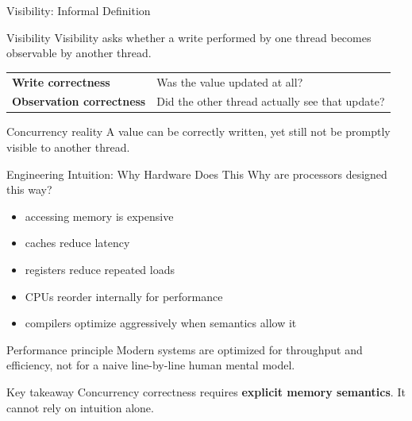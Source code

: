 \documentclass[aspectratio=169,11pt]{beamer}
\begin{document}
	\begin{frame}{Visibility: Informal Definition}
		\begin{block}{Visibility}
			Visibility asks whether a write performed by one thread becomes observable by another thread.
		\end{block}
		
		\vspace{0.3cm}
		
		\begin{center}
			\begin{tabular}{>{\bfseries}m{3cm} m{7.5cm}}
				Write correctness & Was the value updated at all? \\
				Observation correctness & Did the other thread actually see that update? \\
			\end{tabular}
		\end{center}
		
		\vspace{0.3cm}
		
		\begin{alertblock}{Concurrency reality}
			A value can be correctly written, yet still not be promptly visible to another thread.
		\end{alertblock}
	\end{frame}
	
	\begin{frame}{Engineering Intuition: Why Hardware Does This}
		Why are processors designed this way?
		
		\begin{itemize}
			\item accessing memory is expensive
			\item caches reduce latency
			\item registers reduce repeated loads
			\item CPUs reorder internally for performance
			\item compilers optimize aggressively when semantics allow it
		\end{itemize}
		
		\vspace{0.3cm}
		
		\begin{block}{Performance principle}
			Modern systems are optimized for throughput and efficiency, not for a naive line-by-line human mental model.
		\end{block}
		
		\vspace{0.3cm}
		
		\begin{alertblock}{Key takeaway}
			Concurrency correctness requires \textbf{explicit memory semantics}.  
			It cannot rely on intuition alone.
		\end{alertblock}
	\end{frame}
	
\end{document}
